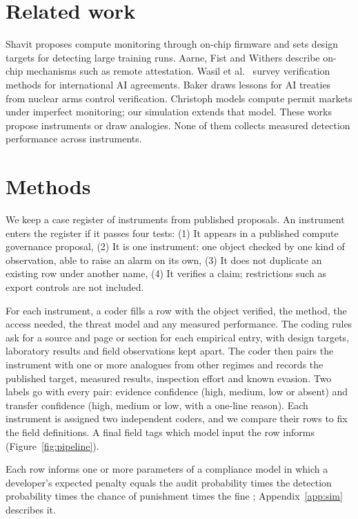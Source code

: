 \documentclass[11pt,a4paper]{article}
\newif\ifhighlight
\newcommand{\addtext}[1]{\ifhighlight{\color{newtext}#1}\else#1\fi}
\begin{document}
\section{Related work}
Shavit \cite{shavit2023} proposes compute monitoring through on-chip firmware and sets design targets for detecting large training runs. Aarne, Fist and Withers \cite{aarne2024} describe on-chip mechanisms such as remote attestation. Wasil et al.\ \cite{wasil2024} survey verification methods for international AI agreements. Baker \cite{baker2023} draws lessons for AI treaties from nuclear arms control verification. Christoph \cite{christoph2026} models compute permit markets under imperfect monitoring; our simulation extends that model. These works propose instruments or draw analogies. None of them collects measured detection performance across instruments.

\section{Methods}
We keep a case register of instruments from published proposals. An instrument enters the register if it passes four tests: (1) It appears in a published compute governance proposal, (2) It is one instrument: one object checked by one kind of observation, able to raise an alarm on its own, (3) It does not duplicate an existing row under another name, (4) It verifies a claim; restrictions such as export controls are not included.

For each instrument, a coder fills a row with the object verified, the method, the access needed, the threat model and any measured performance. The coding rules ask for a source and page or section for each empirical entry, with design targets, laboratory results and field observations kept apart. The coder then pairs the instrument with one or more analogues from other regimes and records the published target, measured results, inspection effort and known evasion. Two labels go with every pair: evidence confidence (high, medium, low or absent) and transfer confidence (high, medium or low, with a one-line reason). Each instrument is assigned two independent coders, and we compare their rows to fix the field definitions. \addtext{A final field tags which model input the row informs (Figure~\ref{fig:pipeline}).}

Each row informs one or more parameters of a compliance model in which a developer's expected penalty equals the audit probability times the detection probability \addtext{times the chance of punishment} times the fine \cite{christoph2026,kaplow1994}\addtext{; Appendix~\ref{app:sim} describes it}.
\end{document}
